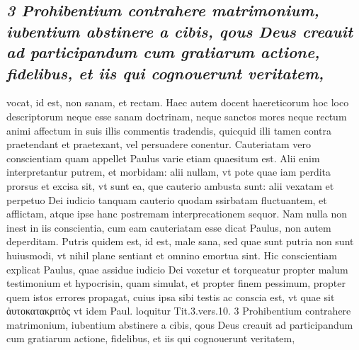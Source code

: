 \documentclass{article}
\begin{document}
\begin{pages}
\subsection*{\textit{3 Prohibentium contrahere matrimonium, iubentium abstinere a cibis, qous Deus creauit ad participandum cum gratiarum actione, fidelibus, et iis qui cognouerunt veritatem,}}vocat, id est, non sanam, et rectam. Haec autem docent haereticorum hoc loco descriptorum neque esse sanam doctrinam, neque sanctos mores neque rectum animi affectum in suis illis commentis tradendis, quicquid illi tamen contra praetendant et praetexant, vel persuadere conentur. Cauteriatam vero conscientiam quam appellet Paulus varie etiam quaesitum est. Alii enim interpretantur putrem, et morbidam: alii nullam, vt pote quae iam perdita prorsus et excisa sit, vt sunt ea, que cauterio ambusta sunt: alii vexatam et perpetuo Dei iudicio tanquam cauterio quodam ssirbatam fluctuantem, et afflictam, atque ipse hanc postremam interprecationem sequor. Nam nulla non inest in iis conscientia, cum eam cauteriatam esse dicat Paulus, non autem deperditam. Putris quidem est, id est, male sana, sed quae sunt putria non sunt huiusmodi, vt nihil plane sentiant et omnino emortua sint. Hic conscientiam explicat Paulus, quae assidue iudicio Dei voxetur et torqueatur propter malum testimonium et hypocrisin, quam simulat, et propter finem pessimum, propter quem istos errores propagat, cuius ipsa sibi testis ac conscia est, vt quae sit ἀυτοκατακριτὸς vt idem Paul. loquitur Tit.3.vers.10. 3 Prohibentium contrahere matrimonium, iubentium abstinere a cibis, qous Deus creauit ad participandum cum gratiarum actione, fidelibus, et iis qui cognouerunt veritatem,  \pend

\end{pages}
\end{document}

